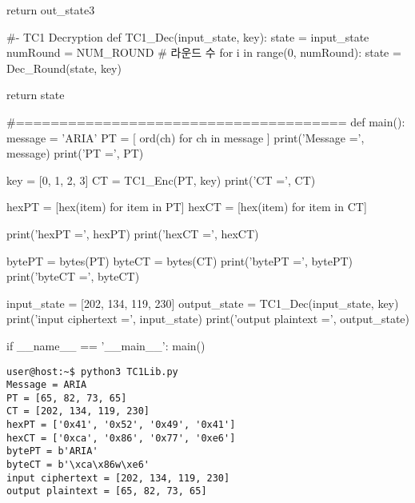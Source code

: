 \begin{python}[TC1Lib.py]
   return out_state3

#- TC1 Decryption
def TC1_Dec(input_state, key):
   state = input_state
   numRound = NUM_ROUND # 라운드 수
   for i in range(0, numRound):
      state = Dec_Round(state, key)

   return state
   
#======================================
def main():
   message = 'ARIA'
   PT = [ ord(ch) for ch in message ]
   print('Message =', message)
   print('PT =', PT)
   
   key = [0, 1, 2, 3]
   CT = TC1_Enc(PT, key)
   print('CT =', CT)
   
   hexPT = [hex(item) for item in PT]
   hexCT = [hex(item) for item in CT]
   
   print('hexPT =', hexPT)
   print('hexCT =', hexCT)
   
   bytePT = bytes(PT)
   byteCT = bytes(CT)
   print('bytePT =', bytePT)
   print('byteCT =', byteCT)

   input_state = [202, 134, 119, 230]
   output_state = TC1_Dec(input_state, key)
   print('input ciphertext =', input_state)
   print('output plaintext =', output_state)

if __name__ == '__main__':
   main()
\end{python}

{\begin{lstlisting}[style=terminal]
user@host:~$ python3 TC1Lib.py                            
Message = ARIA
PT = [65, 82, 73, 65]
CT = [202, 134, 119, 230]
hexPT = ['0x41', '0x52', '0x49', '0x41']
hexCT = ['0xca', '0x86', '0x77', '0xe6']
bytePT = b'ARIA'
byteCT = b'\xca\x86w\xe6'
input ciphertext = [202, 134, 119, 230]
output plaintext = [65, 82, 73, 65]
\end{lstlisting}}

